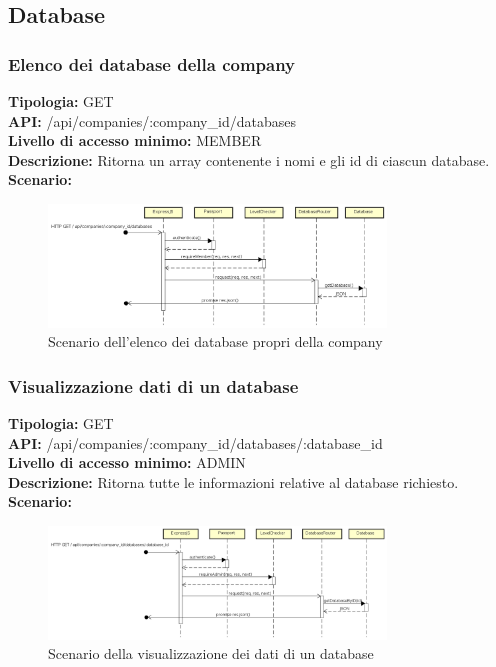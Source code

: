 \newpage
\subsection{Database}
\subsubsection{Elenco dei database della company}
\textbf{Tipologia:} GET \\
\textbf{API:} /api/companies/:company\_id/databases \\
\textbf{Livello di accesso minimo:} MEMBER \\
\textbf{Descrizione:} Ritorna un array contenente i nomi e gli id di ciascun database. \\
\textbf{Scenario:}
\begin{figure}[h]
\centering
\includegraphics[width=0.8\textwidth]{res/sections/backend/(GET)database.png}
\caption{Scenario dell'elenco dei database propri della company}
\end{figure}

\newpage
\subsubsection{Visualizzazione dati di un database}
\textbf{Tipologia:} GET \\
\textbf{API:} /api/companies/:company\_id/databases/:database\_id \\
\textbf{Livello di accesso minimo:} ADMIN \\
\textbf{Descrizione:} Ritorna tutte le informazioni relative al database richiesto. \\
\textbf{Scenario:} 
\begin{figure}[h]
\centering
\includegraphics[width=0.8\textwidth]{res/sections/backend/(GET)databaseById.png}
\caption{Scenario della visualizzazione dei dati di un database}
\end{figure}


